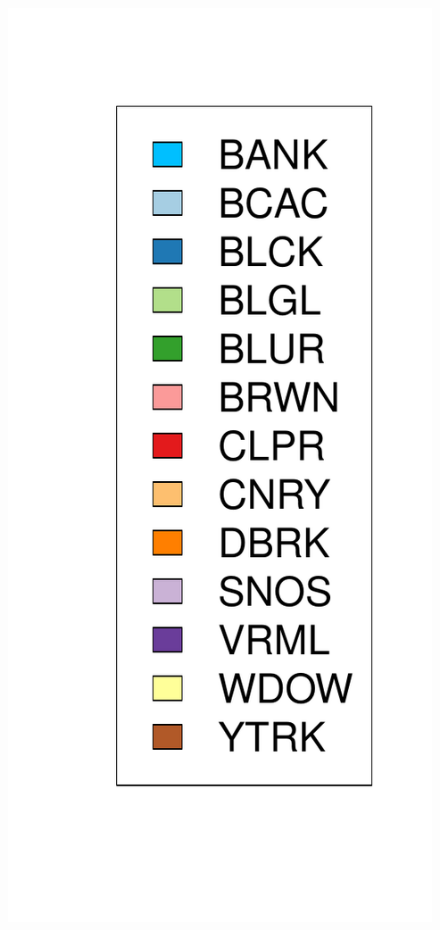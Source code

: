 \documentclass{article}
\begin{document}
\begin{figure}
\begin{minipage}[!ht]{0.89\textwidth}
\begin{center}
\begin{minipage}[!ht]{0.4\textwidth}
        	       \end{minipage}   
        	\end{center}
	\end{minipage}
	\begin{minipage}[!ht]{0.09\textwidth}
		\hspace*{-3cm}
		\includegraphics[width=1.5\textwidth]{barplotLegend.pdf}
	\end{minipage}
\end{figure}
\end{document}
